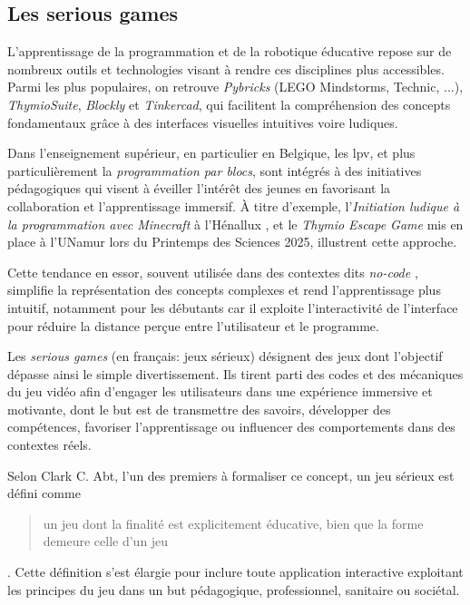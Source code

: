 \subsection{Les serious games} \label{sec:serious_game}
L’apprentissage de la programmation et de la robotique éducative repose sur de nombreux outils et technologies visant à rendre ces disciplines plus accessibles.
Parmi les plus populaires, on retrouve \textit{Pybricks} (LEGO Mindstorms, Technic, ...), \textit{ThymioSuite}, \textit{Blockly} et \textit{Tinkercad}, qui facilitent la compréhension des concepts fondamentaux grâce à des interfaces visuelles intuitives voire ludiques. 

Dans l'enseignement supérieur, en particulier en Belgique, les \acrfull{lpv}, et plus particulièrement la \textit{programmation par blocs}, sont intégrés à des initiatives pédagogiques qui visent à éveiller l’intérêt des jeunes en favorisant la collaboration et l'apprentissage immersif.
À titre d’exemple, l’\textit{Initiation ludique à la programmation avec Minecraft} à l’Hénallux \autocite{christophe_leclere_initiation_2020}, et le \textit{Thymio Escape Game} \autocite{christian_giang_thymio_nodate} mis en place à l’UNamur lors du Printemps des Sciences 2025, illustrent cette approche.

Cette tendance en essor, souvent utilisée dans des contextes dits \textit{no-code} \autocites{noauthor_software_nodate}, simplifie la représentation des concepts complexes et rend l’apprentissage plus intuitif, notamment pour les débutants \autocites{noauthor_visual_2025}{batni_current_2025} car il exploite l’interactivité de l’interface pour réduire la distance perçue entre l’utilisateur et le programme.

Les \textit{serious games} (en français: jeux sérieux) désignent des jeux dont l'objectif dépasse ainsi le simple divertissement.
Ils tirent parti des codes et des mécaniques du jeu vidéo afin d’engager les utilisateurs dans une expérience immersive et motivante, dont le but est de transmettre des savoirs, développer des compétences, favoriser l’apprentissage ou influencer des comportements dans des contextes réels.

Selon Clark C. Abt, l’un des premiers à formaliser ce concept, un jeu sérieux est défini comme \blockquote{un jeu dont la finalité est explicitement éducative, bien que la forme demeure celle d’un jeu} \autocite{abt_serious_1970}.
Cette définition s’est élargie pour inclure toute application interactive exploitant les principes du jeu dans un but pédagogique, professionnel, sanitaire ou sociétal.

